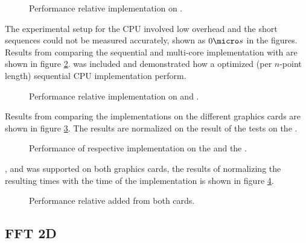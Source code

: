 \begin{figure}[\AllPlacementOptions]
	\centering
	
	\caption{Performance relative {\OCL} implementation on {\AMDCARD}.}
	\label{fig:r260x:implementation}
\end{figure}

The experimental setup for the CPU involved low overhead and the short sequences could not be measured accurately, shown as $0{\micro}s$ in the figures. Results from comparing the sequential {\CPP} and multi-core {\OMP} implementation with {\CU} are shown in figure \ref{fig:gtx:cpu}. {\FFTW} was included and demonstrated how a optimized (per $n$-point length) sequential CPU implementation perform.

\begin{figure}[\AllPlacementOptions]
	\centering
	
	\caption{Performance relative {\CU} implementation on {\NVCARD} and {\INTELCPU}.}
	\label{fig:gtx:cpu}
\end{figure}

Results from comparing the implementations on the different graphics cards are shown in figure \ref{fig:gpu-comparison}. The results are normalized on the result of the tests on the {\NVCARD}.

\begin{figure}[\AllPlacementOptions]
	\centering
	
	\caption{Performance of respective implementation on the {\AMDCARD} and the {\NVCARD}.}
	\label{fig:gpu-comparison}
\end{figure}

{\DX}, {\GL} and {\OCL} was supported on both graphics cards, the results of normalizing the resulting times with the time of the {\OCL} implementation is shown in figure \ref{fig:gpu-comparison-tech}.

\begin{figure}[\AllPlacementOptions]
	\centering
	
	\caption{Performance relative {\OCL} added from both cards.}
	\label{fig:gpu-comparison-tech}
\end{figure}


\newpage

\subsection{FFT 2D}

